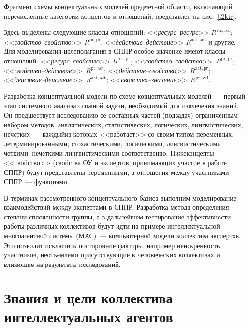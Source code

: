 \begin{multicols}{2}
  Фрагмент схемы концептуальных моделей предметной области, 
включающий перечисленные категории концептов и отношений, представлен 
на рис.~\ref{f2kir}.
  

  
  Здесь выделены следующие классы отношений: <<\textit{ресурс--ресурс}>> 
$R^{\mathrm{res},\mathrm{res}}$; <<\textit{свойство--свойство}>> $R^{\mathrm{pr},\mathrm{pr}}$; 
<<\textit{действие--действие}>> $R^{\mathrm{act},\mathrm{act}}$ и другие. Для моделирования 
целеполагания в СППР особое значение имеют классы отношений: 
<<\textit{ресурс--свойство}>> $R^{\mathrm{res},\mathrm{pr}}$; 
  <<\textit{свойство--свойство}>>~$R^{\mathrm{pr},\mathrm{pr}}$; 
  <<\textit{свойство--действие}>>~$R^{\mathrm{pr},\mathrm{act}}$; 
  <<\textit{дейст\-вие--свойст\-во}>>~$R^{\mathrm{act},\mathrm{pr}}$; 
  <<\textit{дейст\-вие--дейст\-вие}>>~$R^{\mathrm{act},\mathrm{act}}$; 
  <<\textit{свойство--зна\-че\-ние}>>~$R^{\mathrm{pr},\mathrm{val}}$.
  
  Разработка концептуальной модели по схеме концептуальных моделей~--- 
первый этап системного анализа сложной задачи, необходимый для извлечения 
знаний. Он предшествует исследованию ее составных частей (подзадач) 
ограниченным набором методов: аналитических, статистических, логических, 
лингвистических, нечетких~--- каждый\linebreak из которых <<работает>> со своим 
типом переменных: детерминированными, стохастическими, логическими, 
лингвистическими четкими, нечеткими лингвистическими соответственно. 
Ниже\linebreak концепты <<свойство>> (свойства ОУ и экспертов, принимающих 
участие в работе СППР) будут представлены переменными, а отношения между 
участниками СППР~--- функциями.
  
  В терминах рассмотренного концептуального базиса выполним 
моделирование взаимодействий между экспертами в СППР. Разработка метода 
определения степени сплоченности группы, а в дальнейшем тестирование 
эффективности работы различных коллективов будут идти на примере 
интеллектуальной многоагентной системы (МАС)~--- компьютерной модели 
коллектива экспертов. Это позволит исключить посторонние факторы, 
например неискренность участников, не\-отъем\-ле\-мо присутствующие в 
человеческих коллективах и влияющие на результаты исследований.
  
\section{Знания и цели коллектива интеллектуальных агентов}
  

\end{multicols}
